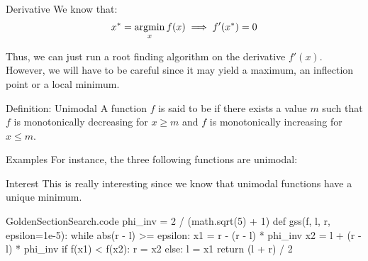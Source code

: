 \documentclass[a4paper]{article}
\begin{document}
\begin{parag}{Derivative}
    We know that: 
    \[x^* = \argmin_{x} f\left(x\right) \implies f'\left(x^*\right) = 0\]

    Thus, we can just run a root finding algorithm on the derivative $f'\left(x\right)$. However, we will have to be careful since it may yield a maximum, an inflection point or a local minimum.
\end{parag}

\begin{parag}{Definition: Unimodal}
    A function $f$ is said to be  if there exists a value $m$ such that $f$ is monotonically decreasing for $x \geq m$ and $f$ is monotonically increasing for $x \leq m$.

    \begin{subparag}{Examples}
        For instance, the three following functions are unimodal:
    \end{subparag}
    
    \begin{subparag}{Interest}
        This is really interesting since we know that unimodal functions have a unique minimum.
    \end{subparag}
\end{parag}

\begin{filecontents*}[overwrite]{GoldenSectionSearch.code}
phi_inv = 2 / (math.sqrt(5) + 1)
def gss(f, l, r, epsilon=1e-5):
    while abs(r - l) >= epsilon:
        x1 = r - (r - l) * phi_inv
        x2 = l + (r - l) * phi_inv
        if f(x1) < f(x2):
            r = x2
        else:
            l = x1
    return (l + r) / 2
\end{filecontents*}
\end{document}
